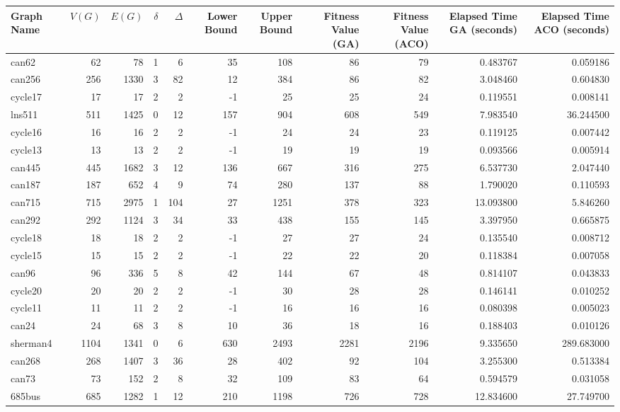 \begin{tabular}{|l|r|r|r|r|r|r|r|r|r|r|}
\toprule
Graph Name & $V(G)$ & $E(G)$ & $\delta$ & $\Delta$ & Lower Bound & Upper Bound & Fitness Value (GA) & Fitness Value (ACO) & Elapsed Time GA (seconds) & Elapsed Time ACO (seconds) \\
\midrule
can62 & 62 & 78 & 1 & 6 & 35 & 108 & 86 & 79 & 0.483767 & 0.059186 \\
can256 & 256 & 1330 & 3 & 82 & 12 & 384 & 86 & 82 & 3.048460 & 0.604830 \\
cycle17 & 17 & 17 & 2 & 2 & -1 & 25 & 25 & 24 & 0.119551 & 0.008141 \\
lns511 & 511 & 1425 & 0 & 12 & 157 & 904 & 608 & 549 & 7.983540 & 36.244500 \\
cycle16 & 16 & 16 & 2 & 2 & -1 & 24 & 24 & 23 & 0.119125 & 0.007442 \\
cycle13 & 13 & 13 & 2 & 2 & -1 & 19 & 19 & 19 & 0.093566 & 0.005914 \\
can445 & 445 & 1682 & 3 & 12 & 136 & 667 & 316 & 275 & 6.537730 & 2.047440 \\
can187 & 187 & 652 & 4 & 9 & 74 & 280 & 137 & 88 & 1.790020 & 0.110593 \\
can715 & 715 & 2975 & 1 & 104 & 27 & 1251 & 378 & 323 & 13.093800 & 5.846260 \\
can292 & 292 & 1124 & 3 & 34 & 33 & 438 & 155 & 145 & 3.397950 & 0.665875 \\
cycle18 & 18 & 18 & 2 & 2 & -1 & 27 & 27 & 24 & 0.135540 & 0.008712 \\
cycle15 & 15 & 15 & 2 & 2 & -1 & 22 & 22 & 20 & 0.118384 & 0.007058 \\
can96 & 96 & 336 & 5 & 8 & 42 & 144 & 67 & 48 & 0.814107 & 0.043833 \\
cycle20 & 20 & 20 & 2 & 2 & -1 & 30 & 28 & 28 & 0.146141 & 0.010252 \\
cycle11 & 11 & 11 & 2 & 2 & -1 & 16 & 16 & 16 & 0.080398 & 0.005023 \\
can24 & 24 & 68 & 3 & 8 & 10 & 36 & 18 & 16 & 0.188403 & 0.010126 \\
sherman4 & 1104 & 1341 & 0 & 6 & 630 & 2493 & 2281 & 2196 & 9.335650 & 289.683000 \\
can268 & 268 & 1407 & 3 & 36 & 28 & 402 & 92 & 104 & 3.255300 & 0.513384 \\
can73 & 73 & 152 & 2 & 8 & 32 & 109 & 83 & 64 & 0.594579 & 0.031058 \\
685bus & 685 & 1282 & 1 & 12 & 210 & 1198 & 726 & 728 & 12.834600 & 27.749700 \\

\end{tabular}
